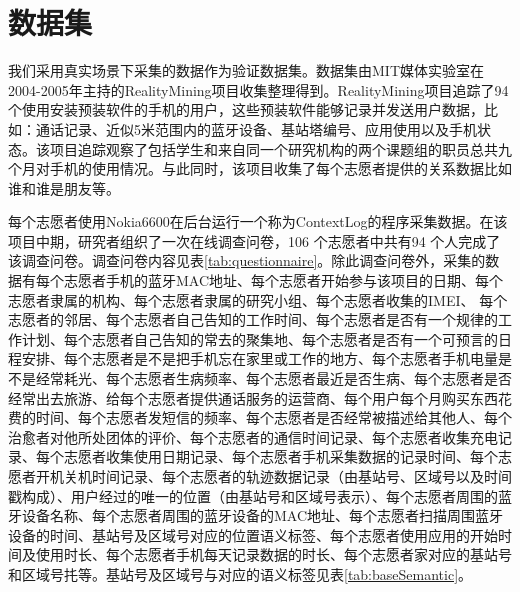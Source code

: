 \section{数据集}
\label{sec:section5-1}
我们采用真实场景下采集的数据作为验证数据集。数据集由MIT媒体实验室在2004-2005年主持的RealityMining项目收集整理得到。RealityMining项目追踪了94个使用安装预装软件的手机的用户，这些预装软件能够记录并发送用户数据，比如：通话记录、近似5米范围内的蓝牙设备、基站塔编号、应用使用以及手机状态。该项目追踪观察了包括学生和来自同一个研究机构的两个课题组的职员总共九个月对手机的使用情况。与此同时，该项目收集了每个志愿者提供的关系数据比如谁和谁是朋友等。
\par 每个志愿者使用Nokia6600在后台运行一个称为ContextLog的程序采集数据。在该项目中期，研究者组织了一次在线调查问卷，106 个志愿者中共有94 个人完成了该调查问卷。调查问卷内容见表\ref{tab:questionnaire}。除此调查问卷外，采集的数据有每个志愿者手机的蓝牙MAC地址、每个志愿者开始参与该项目的日期、每个志愿者隶属的机构、每个志愿者隶属的研究小组、每个志愿者收集的IMEI、 每个志愿者的邻居、每个志愿者自己告知的工作时间、每个志愿者是否有一个规律的工作计划、每个志愿者自己告知的常去的聚集地、每个志愿者是否有一个可预言的日程安排、每个志愿者是不是把手机忘在家里或工作的地方、每个志愿者手机电量是不是经常耗光、每个志愿者生病频率、每个志愿者最近是否生病、每个志愿者是否经常出去旅游、给每个志愿者提供通话服务的运营商、每个用户每个月购买东西花费的时间、每个志愿者发短信的频率、每个志愿者是否经常被描述给其他人、每个治愈者对他所处团体的评价、每个志愿者的通信时间记录、每个志愿者收集充电记录、每个志愿者收集使用日期记录、每个志愿者手机采集数据的记录时间、每个志愿者开机关机时间记录、每个志愿者的轨迹数据记录（由基站号、区域号以及时间戳构成）、用户经过的唯一的位置（由基站号和区域号表示）、每个志愿者周围的蓝牙设备名称、每个志愿者周围的蓝牙设备的MAC地址、每个志愿者扫描周围蓝牙设备的时间、基站号及区域号对应的位置语义标签、每个志愿者使用应用的开始时间及使用时长、每个志愿者手机每天记录数据的时长、每个志愿者家对应的基站号和区域号扥等。基站号及区域号与对应的语义标签见表\ref{tab:baseSemantic}。
